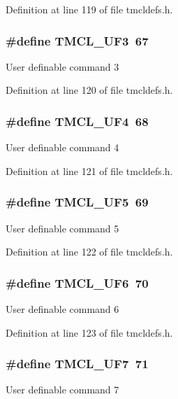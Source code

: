 Definition at line 119 of file tmcldefs.h.\hypertarget{group__TMCLComm_gae6e8731e90f75bc9b1218560f3640926}{
\subsubsection[{TMCL\_\-UF3}]{\setlength{\rightskip}{0pt plus 5cm}\#define TMCL\_\-UF3~67}}
\label{group__TMCLComm_gae6e8731e90f75bc9b1218560f3640926}
User definable command 3 

Definition at line 120 of file tmcldefs.h.\hypertarget{group__TMCLComm_ga24ceb335f6461de5fb3c2bd27cbb7823}{
\subsubsection[{TMCL\_\-UF4}]{\setlength{\rightskip}{0pt plus 5cm}\#define TMCL\_\-UF4~68}}
\label{group__TMCLComm_ga24ceb335f6461de5fb3c2bd27cbb7823}
User definable command 4 

Definition at line 121 of file tmcldefs.h.\hypertarget{group__TMCLComm_ga76c1ecb8e0999fac3d42b5ae4e8cc076}{
\subsubsection[{TMCL\_\-UF5}]{\setlength{\rightskip}{0pt plus 5cm}\#define TMCL\_\-UF5~69}}
\label{group__TMCLComm_ga76c1ecb8e0999fac3d42b5ae4e8cc076}
User definable command 5 

Definition at line 122 of file tmcldefs.h.\hypertarget{group__TMCLComm_gab5c21ab342d5fd4f5df3f5a0b286ccd1}{
\subsubsection[{TMCL\_\-UF6}]{\setlength{\rightskip}{0pt plus 5cm}\#define TMCL\_\-UF6~70}}
\label{group__TMCLComm_gab5c21ab342d5fd4f5df3f5a0b286ccd1}
User definable command 6 

Definition at line 123 of file tmcldefs.h.\hypertarget{group__TMCLComm_gaf16a383aac035a9bcf695ecd66ca8df2}{
\subsubsection[{TMCL\_\-UF7}]{\setlength{\rightskip}{0pt plus 5cm}\#define TMCL\_\-UF7~71}}
\label{group__TMCLComm_gaf16a383aac035a9bcf695ecd66ca8df2}
User definable command 7 

